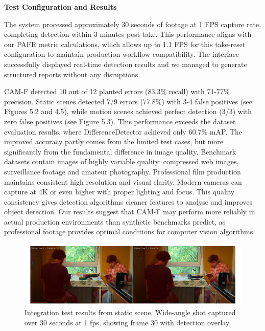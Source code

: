 \textbf{Test Configuration and Results}

The system processed approximately 30 seconds of footage at 1 FPS capture rate, completing detection within 3 minutes post-take. This performance aligns with our PAFR metric calculations, which allows up to 1.1 FPS for this take-reset configuration to maintain production workflow compatibility. The interface successfully displayed real-time detection results and we managed to generate structured reports without any disruptions.

CAM-F detected 10 out of 12 planted errors (83.3\% recall) with 71-77\% precision. Static scenes detected 7/9 errors (77.8\%) with 3-4 false positives (see Figures 5.2 and 4.5), while motion scenes achieved perfect detection (3/3) with zero false positives (see Figure 5.3). This performance exceeds the dataset evaluation results, where DifferenceDetector achieved only 60.7\% mAP. The improved accuracy partly comes from the limited test cases, but more significantly from the fundamental difference in image quality. Benchmark datasets contain images of highly variable quality: compressed web images, surveillance footage and amateur photography. Professional film production maintains consistent high resolution and visual clarity. Modern cameras can capture at 4K or even higher with proper lighting and focus. This quality consistency gives detection algorithms cleaner features to analyse and improves object detection. Our results suggest that CAM-F may perform more reliably in actual production environments than synthetic benchmarks predict, as professional footage provides optimal conditions for computer vision algorithms.

\begin{figure}[h]
\centering
\includegraphics[width=\textwidth]{figures/statictest.png}
\caption{Integration test results from static scene. Wide-angle shot captured over 30 seconds at 1 fps, showing frame 30 with detection overlay.}
\label{fig:static-shots}
\end{figure}

